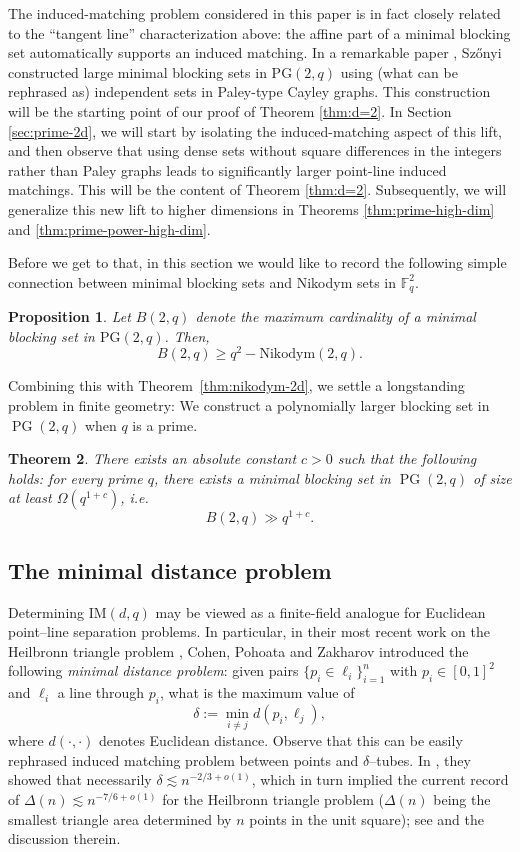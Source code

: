 \documentclass[12pt,reqno]{amsart}
\theoremstyle{plain}
\newtheorem{theorem}{Theorem}[section]
\newtheorem{proposition}[theorem]{Proposition}
\theoremstyle{definition}
\newcommand{\PG}{\mathrm{PG}}
\newcommand{\IM}{\mathrm{IM}}
\newcommand{\Nik}{\mathrm{Nikodym}}
\newcommand{\1}{\mathbf{1}}
\begin{document}
The induced-matching problem considered in this paper is in fact closely related to the ``tangent line''
characterization above: the affine part of a minimal blocking set automatically supports an induced matching. In a remarkable paper \cite{Szonyi1992}, Sz\H{o}nyi~ constructed large minimal blocking sets in $\mathrm{PG}(2,q)$ using (what can be rephrased as) independent sets in Paley-type
Cayley graphs. This construction will be the starting point of our proof of Theorem \ref{thm:d=2}. In Section \ref{sec:prime-2d}, we will start by isolating the induced-matching aspect of this lift, and then observe that using dense sets without square differences in the integers rather than Paley graphs leads to significantly larger point-line induced matchings. This will be the content of Theorem \ref{thm:d=2}. Subsequently, we will generalize this new lift to higher dimensions in Theorems \ref{thm:prime-high-dim} and \ref{thm:prime-power-high-dim}. 

Before we get to that, in this section we would like to record the following simple connection between minimal blocking sets and Nikodym sets in $\mathbb{F}_{q}^{2}$.

\begin{proposition} \label{prop:blocking}
Let $B(2,q)$ denote the maximum cardinality of a minimal blocking set in $\PG(2, q)$. Then,
 $$B(2,q)\ge q^2-\Nik(2,q).$$
\end{proposition}
Combining this with Theorem~\ref{thm:nikodym-2d}, we settle a longstanding problem in finite geometry: We construct a polynomially larger blocking set in $\operatorname{PG}(2,q)$ when $q$ is a prime.

\begin{theorem} \label{thm:blocking-2d-poly}
There exists an absolute constant $c > 0$ such that the following holds: for every prime $q$, there exists a minimal blocking set in $\operatorname{PG}(2,q)$ of size at least $\Omega(q^{1+c})$, i.e.
    $$B(2,q) \gg q^{1+c}.$$ 
\end{theorem}

\subsection{The minimal distance problem}

Determining $\IM(d,q)$ may be viewed as a finite-field analogue for Euclidean point--line separation problems. In particular, in their most recent work on the Heilbronn triangle problem \cite{CPZ}, Cohen, Pohoata and Zakharov introduced the following \emph{minimal distance problem}:
given pairs $\{p_i\in \ell_i\}_{i=1}^n$ with $p_i\in[0,1]^2$ and $\ell_i$ a line through $p_i$, what is the maximum value of
\[
  \delta := \min_{i\neq j} d(p_i,\ell_j),
\]
where $d(\cdot,\cdot)$ denotes Euclidean distance. Observe that this can be easily rephrased induced matching problem between points and $\delta$--tubes. In \cite{CPZ}, they showed that necessarily $\delta\lesssim n^{-2/3+o(1)}$,
which in turn implied the current record of $\Delta(n)\lesssim n^{-7/6+o(1)}$ for the Heilbronn triangle problem
($\Delta(n)$ being the smallest triangle area determined by $n$ points in the unit square); see \cite{CPZ} and the discussion therein.
\end{document}
